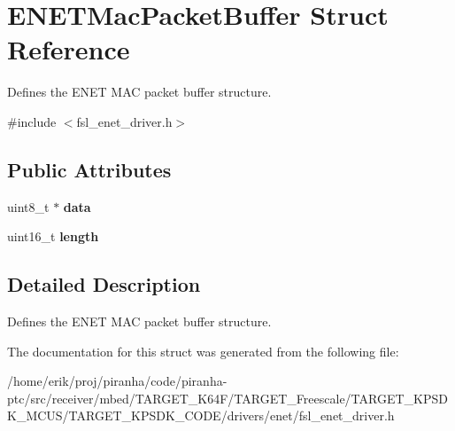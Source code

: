 \hypertarget{structENETMacPacketBuffer}{}\section{E\+N\+E\+T\+Mac\+Packet\+Buffer Struct Reference}
\label{structENETMacPacketBuffer}


Defines the E\+N\+ET M\+AC packet buffer structure.  




{\ttfamily \#include $<$fsl\+\_\+enet\+\_\+driver.\+h$>$}

\subsection*{Public Attributes}
\begin{DoxyCompactItemize}
\item 
uint8\+\_\+t $\ast$ {\bfseries data}\hypertarget{structENETMacPacketBuffer_af0030090921fcc82b07c00045bce456a}{}\label{structENETMacPacketBuffer_af0030090921fcc82b07c00045bce456a}

\item 
uint16\+\_\+t {\bfseries length}\hypertarget{structENETMacPacketBuffer_a229cc05220f9508144a9603a72efc63e}{}\label{structENETMacPacketBuffer_a229cc05220f9508144a9603a72efc63e}

\end{DoxyCompactItemize}


\subsection{Detailed Description}
Defines the E\+N\+ET M\+AC packet buffer structure. 

The documentation for this struct was generated from the following file\+:\begin{DoxyCompactItemize}
\item 
/home/erik/proj/piranha/code/piranha-\/ptc/src/receiver/mbed/\+T\+A\+R\+G\+E\+T\+\_\+\+K64\+F/\+T\+A\+R\+G\+E\+T\+\_\+\+Freescale/\+T\+A\+R\+G\+E\+T\+\_\+\+K\+P\+S\+D\+K\+\_\+\+M\+C\+U\+S/\+T\+A\+R\+G\+E\+T\+\_\+\+K\+P\+S\+D\+K\+\_\+\+C\+O\+D\+E/drivers/enet/fsl\+\_\+enet\+\_\+driver.\+h\end{DoxyCompactItemize}
